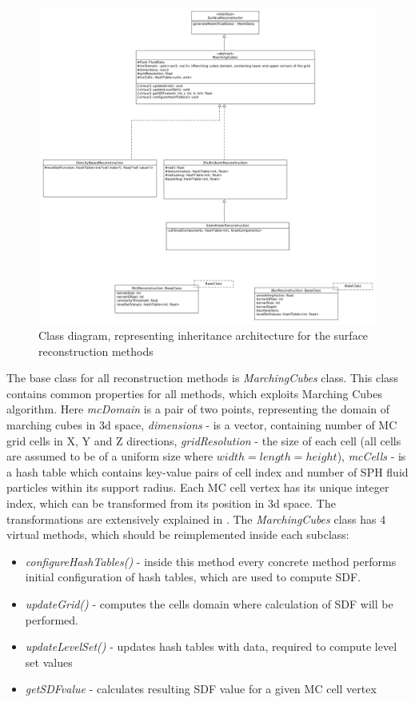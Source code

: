 \begin{figure}[H]

	\begin{center}
		\includegraphics[width=\textwidth]{figures/ClassDiagram.png}
	\end{center}
	\caption{Class diagram, representing inheritance architecture for the surface reconstruction methods}
    \label{fig:class-diagam}
\end{figure}
The base class for all reconstruction methods is \emph{MarchingCubes} class. This class contains common properties for all methods, which exploits Marching Cubes algorithm. Here \emph{mcDomain} is a pair of two points, representing the domain of marching cubes in 3d space, \emph{dimensions} - is a vector, containing number of MC grid cells in X, Y and Z directions, \emph{gridResolution} - the size of each cell (all cells are assumed to be of a uniform size where $width=length=height$), \emph{mcCells} - is a hash table which contains key-value pairs of cell index and number of SPH fluid particles within its support radius. Each MC cell vertex has its unique integer index, which can be transformed from its position in 3d space. The transformations are extensively explained in \cite{Akinchi}. 
The \emph{MarchingCubes} class has 4 virtual methods, which should be reimplemented inside each subclass:
\begin{itemize}
	\item \emph{configureHashTables()} - inside this method every concrete method performs initial configuration of hash tables, which are used to compute SDF.
	\item \emph{updateGrid()} - computes the cells domain where calculation of SDF will be performed.
	\item \emph{updateLevelSet()} - updates hash tables with data, required to compute level set values
	\item \emph{getSDFvalue} - calculates resulting SDF value for a given MC cell vertex
\end{itemize}

